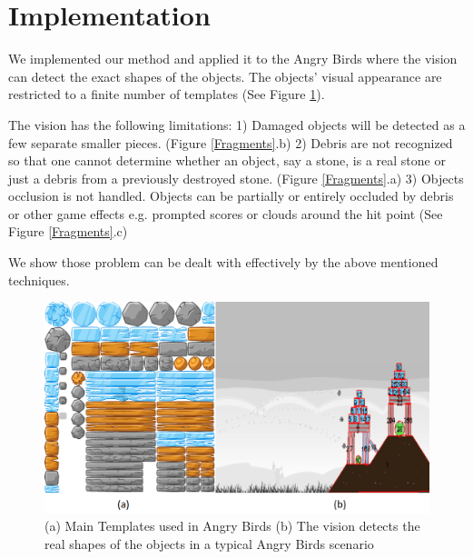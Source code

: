 \documentclass[letterpaper]{article}
\begin{document}
    

\section{Implementation}
We implemented our method and applied it to the Angry Birds where the vision can detect the exact shapes of the objects\cite{}. The objects' visual appearance are restricted to a finite number of templates (See Figure \ref{Templates}).

The vision has the following limitations: 1) Damaged objects will be detected as a few separate smaller pieces. (Figure \ref{Fragments}.b) 2) Debris are not recognized so that one cannot determine whether an object, say a stone, is a real stone or just a debris from a previously destroyed stone. (Figure \ref{Fragments}.a) 3) Objects occlusion is not handled. Objects can be partially or entirely occluded by debris or other game effects e.g. prompted scores or clouds around the hit point (See Figure \ref{Fragments}.c)

We show those problem can be dealt with effectively by the above mentioned techniques.

\begin{figure}[h!]
\centering\includegraphics[scale=0.28]{Templates.png}\caption{(a) Main Templates used in Angry Birds (b) The vision detects the real shapes of the objects in a typical Angry Birds scenario}
\label{Templates}
\end{figure}
\end{document}
